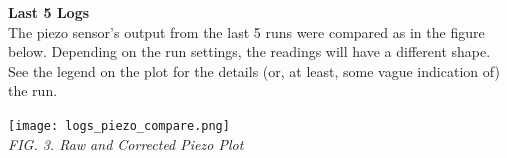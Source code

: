 \documentclass{article}
\begin{document}
	\twocolumn
	
	{\centering\textbf{Last 5 Logs}\\}
	The piezo sensor's output from the last 5 runs were compared as in the figure below. Depending on the run settings, the readings will have a different shape. See the legend on the plot for the details (or, at least, some vague indication of) the run.
	
	{\centering \texttt{[image: logs\_piezo\_compare.png]}\\
	\textit{FIG. 3. Raw and Corrected Piezo Plot}\\}
	
\end{document}
